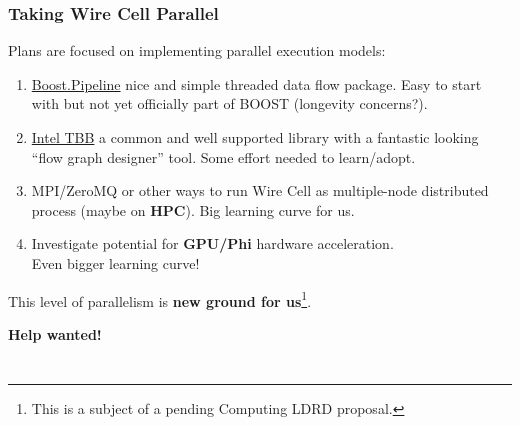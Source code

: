 \documentclass[xcolor=dvipsnames]{beamer}
\begin{document}
\begin{frame}
  \frametitle{Taking Wire Cell Parallel}

  Plans are focused on implementing parallel execution models:

  \begin{enumerate}\footnotesize
  \item \href{https://github.com/erenon/pipeline}{Boost.Pipeline} nice
    and simple threaded data flow package.  Easy to start with but not
    yet officially part of BOOST (longevity concerns?).
  \item \href{https://www.threadingbuildingblocks.org/}{Intel TBB} a
    common and well supported library with a fantastic looking ``flow
    graph designer'' tool.  Some effort needed to learn/adopt.
  \item MPI/ZeroMQ or other ways to run Wire Cell as multiple-node
    distributed process (maybe on \textbf{HPC}).  Big learning curve
    for us.
  \item Investigate potential for \textbf{GPU/Phi} hardware
    acceleration.  \\ Even bigger learning curve!
  \end{enumerate}

  This level of parallelism is \textbf{new ground for us}\footnote{This is a subject of a pending Computing LDRD proposal.}.

  \textbf{Help wanted!}
\end{frame}


\section{}
\end{document}
